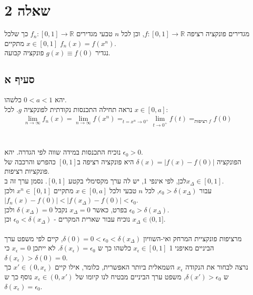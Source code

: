 \documentclass{article}
\DeclareMathOperator*{\equals}{=}
\def\reals{\mathbb{R}}
\begin{document}
\pagebreak

\section*{שאלה 2}

מגדירים פונקציה רציפה $f: [0,1]\rightarrow \reals$, וכן לכל $n$ טבעי מגדירים $f_n: [0,1] \rightarrow\reals$ כך שלכל $x\in [0,1]$ מתקיים $f_n(x)=f(x^n)$. \\
נגדיר $g(x)\equiv f(0)$ פונקציה קבועה.

\subsection*{סעיף א}

יהא $0<a<1$ כלשהו. \\
נראה תחילה התכנסות נקודתית לפונקציה $g$. לכל $x\in [0,a]$:
\begin{align*}
    \lim_{n\rightarrow \infty}f_n (x) =
    \lim_{n\rightarrow \infty} f(x^n) \equals_{t=x^n\rightarrow 0^+}
    \lim_{t\rightarrow 0^+}f(t) \equals_{\text{רציפות $f$}}
    f(0)
\end{align*}
\\\\
נוכיח התכנסות במידה שווה לפי הגדרה. יהא $\epsilon_0>0$. \\
הפונקציה $\delta(x)=|f(x)-f(0)|$ היא פונקציה רציפה ב$[0,1]$ כהפרש והרכבה של פונקציות רציפות. \\
לכן, לפי אינפי 1, יש לה ערך מקסימלי בקטע $[0,1]$. נסמן ערך זה ב$x_\Delta\in [0,1]$. \\
עבור $\epsilon_0 > \delta(x_\Delta)$, לכל $n$ טבעי ולכל $x\in [0,a]$ מתקיים $x^n\in [0,1]$ ולכן $|f_n(x)-f(0)|<|f(x_\Delta)-f(0)|<\epsilon_0$. \\
בפרט, כאשר $x_\Delta=0$ נקבל $\delta(x_\Delta)=0$ ולכן $\epsilon_0>\delta(x_\Delta)$.\\
נוכיח עבור שארית המקרים - $\epsilon_0<\delta(x_\Delta)$ וכן $x_\Delta\in(0,1]$.
    \\\\
    מרציפות פונקציית המרחק ואי-השוויון $\delta(0)=0<\epsilon_0<\delta(x_\Delta)$, קיים לפי משפט ערך הביניים מאיפני 1 $x_\epsilon\in [0,1]$ כלשהו כך ש $\delta(x_\epsilon)=\epsilon_0$.
    לא ייתכן $x_\epsilon=0$ כי $\delta(x_\epsilon)>\delta(0)=0$. \\
    נרצה לבחור את הנקודה $x_\epsilon$ השמאלית ביותר האפשרית,
    כלומר, אילו קיים $x'\in (0,x_\epsilon)$ כך ש $\delta(x')>\epsilon_0$, משפט ערך הביניים מבטיח לנו קיומו של $x_\epsilon\in(0,x')$ נוסף כך ש $\delta(x_\epsilon)=\epsilon_0$.
\end{document}
